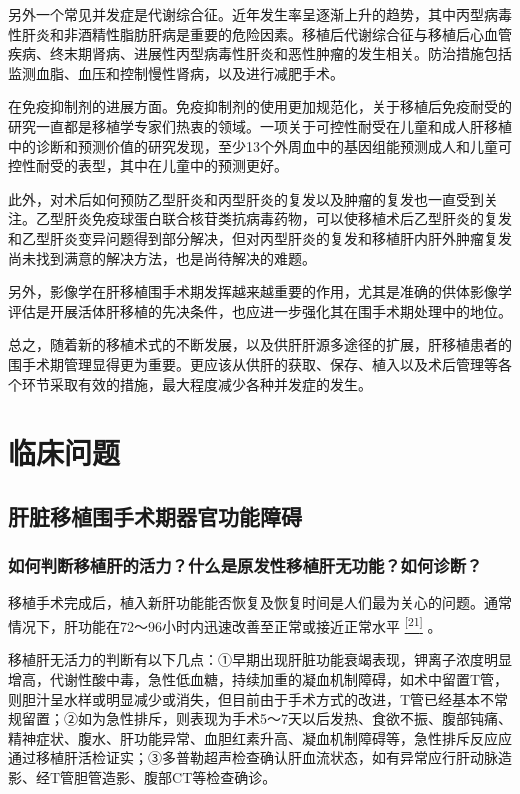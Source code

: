 另外一个常见并发症是代谢综合征。近年发生率呈逐渐上升的趋势，其中丙型病毒性肝炎和非酒精性脂肪肝病是重要的危险因素。移植后代谢综合征与移植后心血管疾病、终末期肾病、进展性丙型病毒性肝炎和恶性肿瘤的发生相关。防治措施包括监测血脂、血压和控制慢性肾病，以及进行减肥手术。

在免疫抑制剂的进展方面。免疫抑制剂的使用更加规范化，关于移植后免疫耐受的研究一直都是移植学专家们热衷的领域。一项关于可控性耐受在儿童和成人肝移植中的诊断和预测价值的研究发现，至少13个外周血中的基因组能预测成人和儿童可控性耐受的表型，其中在儿童中的预测更好。

此外，对术后如何预防乙型肝炎和丙型肝炎的复发以及肿瘤的复发也一直受到关注。乙型肝炎免疫球蛋白联合核苷类抗病毒药物，可以使移植术后乙型肝炎的复发和乙型肝炎变异问题得到部分解决，但对丙型肝炎的复发和移植肝内肝外肿瘤复发尚未找到满意的解决方法，也是尚待解决的难题。

另外，影像学在肝移植围手术期发挥越来越重要的作用，尤其是准确的供体影像学评估是开展活体肝移植的先决条件，也应进一步强化其在围手术期处理中的地位。

总之，随着新的移植术式的不断发展，以及供肝肝源多途径的扩展，肝移植患者的围手术期管理显得更为重要。更应该从供肝的获取、保存、植入以及术后管理等各个环节采取有效的措施，最大程度减少各种并发症的发生。

\section{临床问题}

\subsection{肝脏移植围手术期器官功能障碍}

\subsubsection{如何判断移植肝的活力？什么是原发性移植肝无功能？如何诊断？}

移植手术完成后，植入新肝功能能否恢复及恢复时间是人们最为关心的问题。通常情况下，肝功能在72～96小时内迅速改善至正常或接近正常水平
\protect\hyperlink{text00020.htmlux5cux23ch21-19}{\textsuperscript{{[}21{]}}}
。

移植肝无活力的判断有以下几点：①早期出现肝脏功能衰竭表现，钾离子浓度明显增高，代谢性酸中毒，急性低血糖，持续加重的凝血机制障碍，如术中留置T管，则胆汁呈水样或明显减少或消失，但目前由于手术方式的改进，T管已经基本不常规留置；②如为急性排斥，则表现为手术5～7天以后发热、食欲不振、腹部钝痛、精神症状、腹水、肝功能异常、血胆红素升高、凝血机制障碍等，急性排斥反应应通过移植肝活检证实；③多普勒超声检查确认肝血流状态，如有异常应行肝动脉造影、经T管胆管造影、腹部CT等检查确诊。

